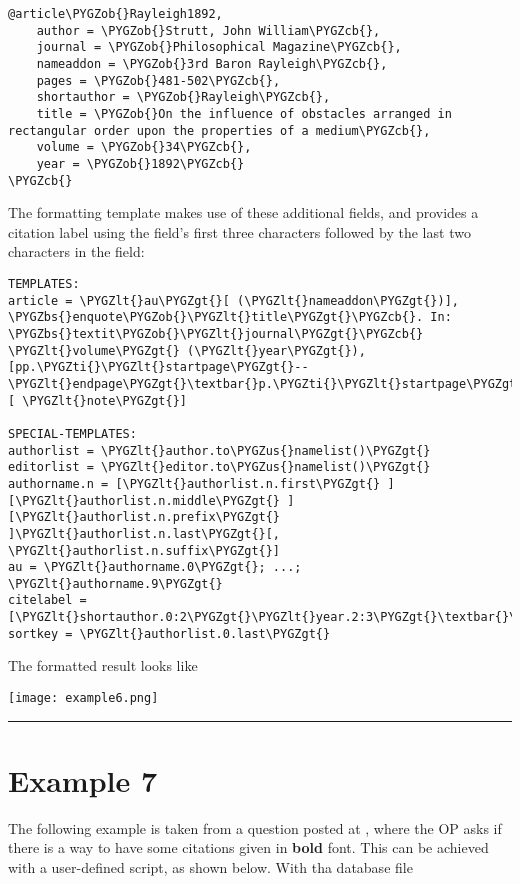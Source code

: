\documentclass[letterpaper,10pt,english]{sphinxmanual}
\def\PYGZbs{\char`\\}
\def\PYGZus{\char`\_}
\def\PYGZob{\char`\{}
\def\PYGZcb{\char`\}}
\def\PYGZlt{\char`\<}
\def\PYGZgt{\char`\>}
\def\PYGZti{\char`\~}
\begin{document}
\begin{Verbatim}[commandchars=\\\{\}]
@article\PYGZob{}Rayleigh1892,
    author = \PYGZob{}Strutt, John William\PYGZcb{},
    journal = \PYGZob{}Philosophical Magazine\PYGZcb{},
    nameaddon = \PYGZob{}3rd Baron Rayleigh\PYGZcb{},
    pages = \PYGZob{}481-502\PYGZcb{},
    shortauthor = \PYGZob{}Rayleigh\PYGZcb{},
    title = \PYGZob{}On the influence of obstacles arranged in rectangular order upon the properties of a medium\PYGZcb{},
    volume = \PYGZob{}34\PYGZcb{},
    year = \PYGZob{}1892\PYGZcb{}
\PYGZcb{}
\end{Verbatim}

The formatting template makes use of these additional fields, and provides a citation label using the  field's first three characters followed by the last two characters in the  field:

\begin{Verbatim}[commandchars=\\\{\}]
TEMPLATES:
article = \PYGZlt{}au\PYGZgt{}[ (\PYGZlt{}nameaddon\PYGZgt{})], \PYGZbs{}enquote\PYGZob{}\PYGZlt{}title\PYGZgt{}\PYGZcb{}. In: \PYGZbs{}textit\PYGZob{}\PYGZlt{}journal\PYGZgt{}\PYGZcb{} \PYGZlt{}volume\PYGZgt{} (\PYGZlt{}year\PYGZgt{}), [pp.\PYGZti{}\PYGZlt{}startpage\PYGZgt{}--\PYGZlt{}endpage\PYGZgt{}\textbar{}p.\PYGZti{}\PYGZlt{}startpage\PYGZgt{}\textbar{}\PYGZlt{}eid\PYGZgt{}\textbar{}].[ \PYGZlt{}note\PYGZgt{}]

SPECIAL-TEMPLATES:
authorlist = \PYGZlt{}author.to\PYGZus{}namelist()\PYGZgt{}
editorlist = \PYGZlt{}editor.to\PYGZus{}namelist()\PYGZgt{}
authorname.n = [\PYGZlt{}authorlist.n.first\PYGZgt{} ][\PYGZlt{}authorlist.n.middle\PYGZgt{} ][\PYGZlt{}authorlist.n.prefix\PYGZgt{} ]\PYGZlt{}authorlist.n.last\PYGZgt{}[, \PYGZlt{}authorlist.n.suffix\PYGZgt{}]
au = \PYGZlt{}authorname.0\PYGZgt{}; ...; \PYGZlt{}authorname.9\PYGZgt{}
citelabel = [\PYGZlt{}shortauthor.0:2\PYGZgt{}\PYGZlt{}year.2:3\PYGZgt{}\textbar{}\PYGZlt{}authorlist.0.last.0:2\PYGZgt{}\PYGZlt{}year.2:3\PYGZgt{}\textbar{}]
sortkey = \PYGZlt{}authorlist.0.last\PYGZgt{}
\end{Verbatim}

The formatted result looks like

\texttt{[image: example6.png]}


\bigskip\hrule{}\bigskip



\section{Example 7}
\label{examples:example-7}
The following example is taken from a question posted at , where the OP asks if there is a way to have some citations given in \textbf{bold} font. This can be achieved with a user-defined script, as shown below. With tha database file
\end{document}
